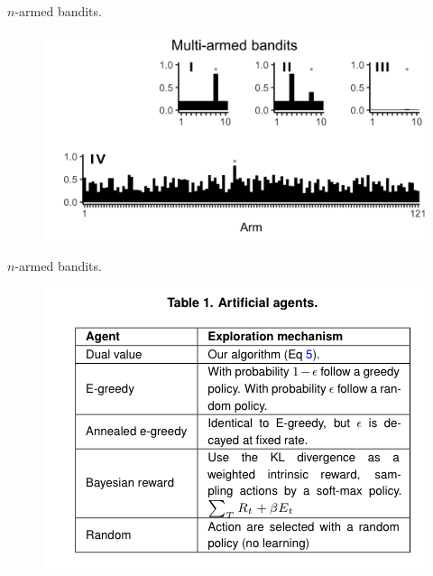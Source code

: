 \documentclass[10pt]{beamer}
\begin{document}
\begin{frame}[fragile]{$n$-armed bandits.}
\begin{figure}
    \centering
    \includegraphics[scale=0.2]{images/fig2.png}
    \caption{}
\end{figure}
\end{frame}

\begin{frame}[fragile]{$n$-armed bandits.}
\begin{figure}
    \centering
    \includegraphics[scale=0.8]{images/agents.png}
    \caption{}
\end{figure}
\end{frame}
\end{document}

